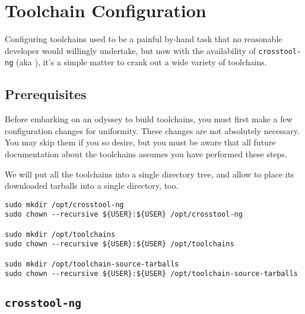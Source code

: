 %
%
%
%
\chapter{Toolchain Configuration}\label{chap:toolchain-configuration}

Configuring toolchains used to be a painful by-hand task that no
reasonable developer would willingly undertake, but now with the
availability of \texttt{crosstool-ng} (aka \ctng), it's a simple matter
to crank out a wide variety of toolchains.

\section{Prerequisites}

Before embarking on an odyssey to build toolchains, you must first
make a few configuration changes for uniformity.  These changes are
not absolutely necessary.  You may skip them if you so desire, but you
must be aware that all future documentation about the toolchains
assumes you have performed these steps.

We will put all the toolchains into a single directory tree, and
allow \ctng to place its downloaded tarballs into a single
directory, too.

\begin{verbatim}
sudo mkdir /opt/crosstool-ng
sudo chown --recursive ${USER}:${USER} /opt/crosstool-ng

sudo mkdir /opt/toolchains
sudo chown --recursive ${USER}:${USER} /opt/toolchains

sudo mkdir /opt/toolchain-source-tarballs
sudo chown --recursive ${USER}:${USER} /opt/toolchain-source-tarballs
\end{verbatim}

\section{\texttt{crosstool-ng}}

